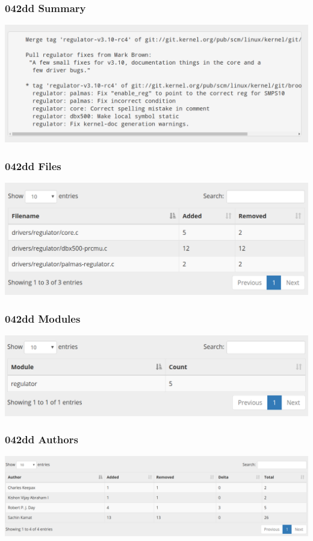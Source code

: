 \documentclass[15pt]{beamer}
\begin{document}
\begin{frame}
  \frametitle{042dd Summary}
  \begin{center}
    \includegraphics[width=\textwidth]{figures/042d/summary.png}
  \end{center}
\end{frame}

\begin{frame}
  \frametitle{042dd Files}
  \begin{center}
    \includegraphics[width=\textwidth]{figures/042d/files.png}
  \end{center}
\end{frame}

\begin{frame}
  \frametitle{042dd Modules}
  \begin{center}
    \includegraphics[width=\textwidth]{figures/042d/modules.png}
  \end{center}
\end{frame}

\begin{frame}
  \frametitle{042dd Authors}
  \begin{center}
    \includegraphics[width=\textwidth]{figures/042d/042dd_authors.png}
  \end{center}
\end{frame}
\end{document}

